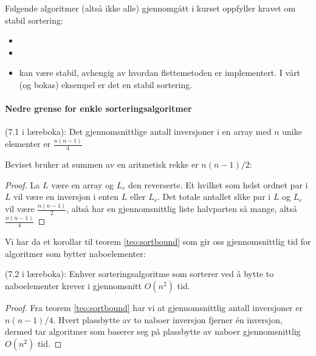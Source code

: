 Følgende algoritmer (altså ikke alle) gjennomgått i kurset oppfyller kravet om
stabil sortering:
\begin{itemize}
\item {} 
\item {} 
\item {} kan være stabil, avhengig av hvordan flettemetoden er implementert. I vårt (og bokas) eksempel er det en stabil sortering.
\end{itemize}


\paragraph{Nedre grense for enkle sorteringsalgoritmer}
\begin{theorem} (7.1 i læreboka): Det gjennomsnittlige antall inversjoner i en \label{teo:sortbound}
  array med $n$ unike elementer er $\frac{n(n-1)}{4}$
\end{theorem}
Beviset bruker at summen av en aritmetisk rekke er $ n(n-1)/2 $:
\begin{proof}
  La $L$ være en array og $L_r$ den reverserte. Et hvilket som helst ordnet par
  i $L$ vil være en inversjon i enten $L$ eller $L_r$. Det totale antallet slike
  par i $L$ og $L_r$ vil være $\frac{n(n-1)}{2}$, altså har en gjennomsnittlig
  liste halvparten så mange, altså $\frac{n(n-1)}{4}$ 
\end{proof}
Vi har da et korollar til teorem \ref{teo:sortbound} som gir oss gjennomsnittlig tid for algoritmer som bytter naboelementer:
\begin{corollary} (7.2 i læreboka): \label{teo:swapkompl}
  Enhver sorteringsalgoritme som sorterer ved å bytte to naboelementer krever i gjennomsnitt $ O(n^2) $ tid.
\end{corollary}
\begin{proof}
Fra teorem \ref{teo:sortbound} har vi at gjennomsnittlig antall inversjoner er $ n(n-1)/4 $. Hvert plassbytte av to naboer inversjon fjerner én inversjon, dermed tar algoritmer som baserer seg på plassbytte av naboer gjennomsnittlig $ O(n^2) $ tid.
\end{proof}